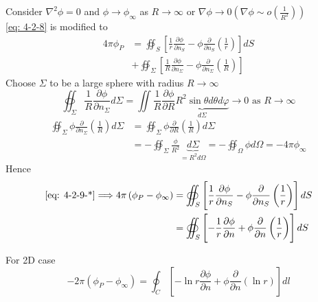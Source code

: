 Consider $\nabla^2\phi = 0$ and $\phi\to\phi_\infty$ as $R\to\infty$ or $\displaystyle\nabla\phi\to 0\left(\nabla\phi\sim o\left(\frac{1}{R^2}\right)\right)$\\
\eqref{eq: 4-2-8} is modified to 
\begin{equation}
\begin{aligned}
4\pi\phi_P
&= \oiint_S\left[\frac{1}{r}\frac{\partial\phi}{\partial n_S} - \phi\frac{\partial}{\partial n_S}\left(\frac{1}{r}\right)\right]dS \\
&+ \oiint_\Sigma\left[\frac{1}{R}\frac{\partial\phi}{\partial n_\Sigma} - \phi\frac{\partial}{\partial n_\Sigma}\left(\frac{1}{R}\right)\right]
\end{aligned}
\tag{$\ast$}
\label{eq: 4-2-9-*}
\end{equation}
Choose $\Sigma$ to be a large sphere with radius $R\to\infty$
\[
\oiint_\Sigma\frac{1}{R}\frac{\partial\phi}{\partial n_\Sigma}d\Sigma = \iint\frac{1}{R}\frac{\partial\phi}{\partial R}\underbrace{R^2\sin\theta d\theta d\varphi}_{d\Sigma}\to 0\text{ as }R\to \infty
\]
\begin{align*}
\oiint_\Sigma\phi\frac{\partial}{\partial n_\Sigma}\left(\frac{1}{R}\right)d\Sigma
&= \oiint_\Sigma\phi\frac{\partial}{\partial R}\left(\frac{1}{R}\right)d\Sigma \\
&= - \oiint_\Sigma \frac{\phi}{R^2} \underbrace{d\Sigma}_{=R^2d\Omega} = -\oiint_\Omega \phi d\Omega = -4\pi \phi_\infty
\end{align*}
Hence
\begin{equation}
\begin{aligned}
\eqref{eq: 4-2-9-*} \Longrightarrow
4\pi\left(\phi_P-\phi_\infty\right)
&= \oiint_S\left[\frac{1}{r}\frac{\partial\phi}{\partial n_S} - \phi\frac{\partial}{\partial n_S}\left(\frac{1}{r}\right)\right]dS \\
&= \oiint_S\left[-\frac{1}{r}\frac{\partial\phi}{\partial n} + \phi\frac{\partial}{\partial n}\left(\frac{1}{r}\right)\right]dS
\end{aligned}
\label{eq: 4-2-10}
\end{equation}
\begin{exercise}{For 2D case}
\begin{equation}
-2\pi\left(\phi_P-\phi_\infty\right) = \oint_C\left[-\ln r\frac{\partial\phi}{\partial n} + \phi\frac{\partial}{\partial n}\left(\ln r\right)\right]dl
\end{equation}
\end{exercise}

